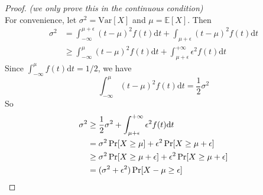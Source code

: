 \begin{proof}
  \emph{(we only prove this in the continuous condition)}\\
  For convenience, let $\sigma^2 = \mathrm{Var}[X]$ and $\mu = \mathbb{E}[X]$.
  Then
  \begin{align*}
    \sigma^2 &= \int_{-\infty}^{\mu+\epsilon} (t-\mu)^2f(t)\mathrm{d}t + \int_{\mu+\epsilon}(t - \mu)^2f(t)\mathrm{d}t \\
    &\geq \int_{-\infty}^{\mu} (t-\mu)^2f(t)\mathrm{d}t + \int_{\mu+\epsilon}^{+\infty}\epsilon^2f(t)\mathrm{d}t
  \end{align*}
  Since $\int_{-\infty}^\mu f(t)\mathrm{d}t = 1/2$, we have
  \[\int_{-\infty}^\mu (t-\mu)^2f(t)\mathrm{d}t = \frac{1}{2}\sigma^2\]
  So
  \begin{align*}
    \sigma^2 &\geq \frac{1}{2}\sigma^2 + \int_{\mu+\epsilon}^{+\infty}\epsilon^2f(t)\mathrm{d}t \\
    &= \sigma^2\Pr[X\geq \mu] + \epsilon^2\Pr[X\geq \mu+\epsilon] \\
    &\geq \sigma^2\Pr[X\geq \mu+\epsilon] + \epsilon^2\Pr[X\geq \mu+\epsilon] \\
    &= (\sigma^2 + \epsilon^2)\Pr[X - \mu\geq \epsilon] \qedhere
  \end{align*}
\end{proof}
